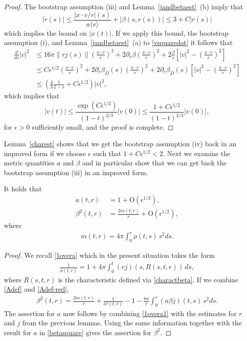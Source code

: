 \documentclass[11pt]{article}
\def\p0{\langle v \rangle}
\begin{document}
\begin{proof}
  The bootstrap assumption (iii) and Lemma~\ref{jandbetaest}~(b) imply that
  \[
  |\dot r(s)| \leq \frac{|x\cdot v/r|(s)}{a \p0} +
  |\beta(s,r(s))| \leq 3 + C |r(s)|
  \]
  which implies the bound on $|x(t)|$.
  If we apply this bound, the bootstrap assumption (i),
  and Lemma~\ref{jandbetaest}~(a) 
  to \eqref{vsquaredot} it follows that
  \begin{align*}
    \frac{d}{ds} |v|^2
    &\leq
    16\pi \|r j(s)\| \left(\frac{x\cdot v}{r}\right)^2
    + 2 \partial_r\beta \left(\frac{x\cdot v}{r}\right)^2
    + 2 \frac{\beta}{r}
    \left[|v|^2 - \left(\frac{x\cdot v}{r}\right)^2\right] \\
    &\leq
    C \epsilon^{1/2} \left(\frac{x\cdot v}{r}\right)^2
    + 2 \partial_r\beta_D(s) \left(\frac{x\cdot v}{r}\right)^2
    + 2 \partial_r\beta_D(s)
    \left[|v|^2 - \left(\frac{x\cdot v}{r}\right)^2\right]\\
    &\leq
    \left(\frac{4}{3} \frac{1}{1-s} + C \epsilon^{1/2}\right) |v|^2,
  \end{align*}
  which implies that
  \[
  |v(t)| \leq
  \frac{\exp(C \epsilon^{1/2})}{(1- t)^{2/3}} |v(0)|
  \leq
  \frac{1 + C \epsilon^{1/2}}{(1-t)^{2/3}} |v(0)|,
  \]
  for $\epsilon>0$ sufficiently small, and the proof is complete.
\end{proof}
%
Lemma~\ref{charest} shows that we get
the bootstrap assumption (iv) back in an improved form
if we choose $\epsilon$ such that
$1 + C \epsilon^{1/2} < 2$.
Next we examine the metric quantities $a$ and $\beta$ and in particular
show that we can get back the bootstrap assumption (iii) in an improved form. 
%
\begin{lemma} \label{simpleabeta}
  It holds that
  \begin{align*}
    a(t,r) &= 1 + \mathrm{O}(\epsilon^{1/2}),\\
    \beta^2(t,r) &= \frac{2 m(t,r)}{r} + \mathrm{O}(\epsilon^{1/2}),
  \end{align*}
  where 
  \begin{align}\label{mdef}
    m(t,r) = 4\pi \int_0^r \rho(t,s)\, s^2 ds.
  \end{align}
\end{lemma}
%
\begin{proof}
  We recall \eqref{1overa} which in the present situation
  takes the form
  \begin{align}\label{1overa1}
    \frac{1}{a(t,r)}=
    1 + 4\pi \int_0^t(r j)(s,R(s,t,r))\, ds,
  \end{align}
  where $R(s,t,r)$ is the characteristic defined via \eqref{charactbeta}.
  If we combine \eqref{Adef} and \eqref{Adef-red},
  \begin{align}\label{betasquare}
    \beta^2(t,r)= \frac{2 m(t,r)}{r} + \frac{1}{a^2(t,r)} - 1
    - \frac{8\pi}{r}\int_0^r (a \beta j)(t,s)\, s^2 ds .
  \end{align}
  The assertion for $a$ now follows by combining \eqref{1overa1} with the
  estimates for $r$ and $j$ from the previous lemmas. Using the same
  information together with the result for $a$ in \eqref{betasquare}
  gives the assertion for $\beta^2$.
\end{proof}
\end{document}
